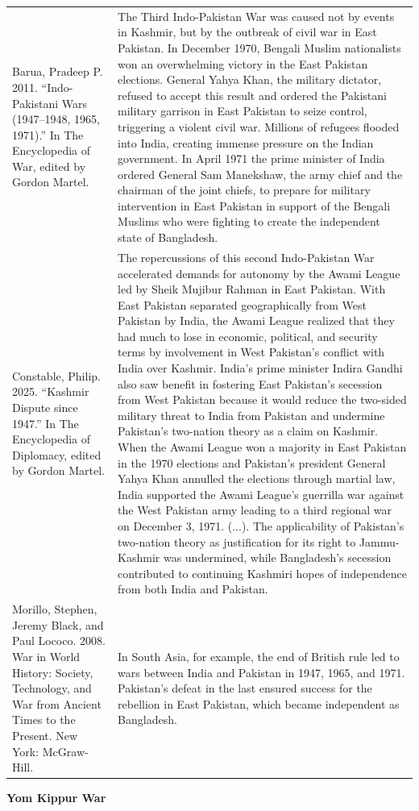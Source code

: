 {\begin{longtable}{p{}p{}}
\\
Barua, Pradeep P. 2011. “Indo-Pakistani Wars (1947–1948, 1965, 1971).” In The Encyclopedia of War, edited by Gordon Martel. & The Third Indo-Pakistan War was caused not by events in Kashmir, but by the outbreak of civil war in East Pakistan. In December 1970, Bengali Muslim nationalists won an overwhelming victory in the East Pakistan elections. General Yahya Khan, the military dictator, refused to accept this result and ordered the Pakistani military garrison in East Pakistan to seize control, triggering a violent civil war. Millions of refugees flooded into India, creating immense pressure on the Indian government. In April 1971 the prime minister of India ordered General Sam Manekshaw, the army chief and the chairman of the joint chiefs, to prepare for military intervention in East Pakistan in support of the Bengali Muslims who were fighting to create the independent state of Bangladesh.
\\
Constable, Philip. 2025. “Kashmir Dispute since 1947.” In The Encyclopedia of Diplomacy, edited by Gordon Martel. & The repercussions of this second Indo-Pakistan War accelerated demands for autonomy by the Awami League led by Sheik Mujibur Rahman in East Pakistan. With East Pakistan separated geographically from West Pakistan by India, the Awami League realized that they had much to lose in economic, political, and security terms by involvement in West Pakistan's conflict with India over Kashmir. India's prime minister Indira Gandhi also saw benefit in fostering East Pakistan's secession from West Pakistan because it would reduce the two-sided military threat to India from Pakistan and undermine Pakistan's two-nation theory as a claim on Kashmir. When the Awami League won a majority in East Pakistan in the 1970 elections and Pakistan's president General Yahya Khan annulled the elections through martial law, India supported the Awami League's guerrilla war against the West Pakistan army leading to a third regional war on December 3, 1971. (...). The applicability of Pakistan's two-nation theory as justification for its right to Jammu-Kashmir was undermined, while Bangladesh's secession contributed to continuing Kashmiri hopes of independence from both India and Pakistan.
\\
Morillo, Stephen, Jeremy Black, and Paul Lococo. 2008. War in World History: Society, Technology, and War from Ancient Times to the Present. New York: McGraw-Hill. & In South Asia, for example, the end of British rule led to wars between India and Pakistan in 1947, 1965, and 1971. Pakistan's defeat in the last ensured success for the rebellion in East Pakistan, which became independent as Bangladesh.
\\
\end{longtable}}
\clearpage
         \textbf{Yom Kippur War} 

